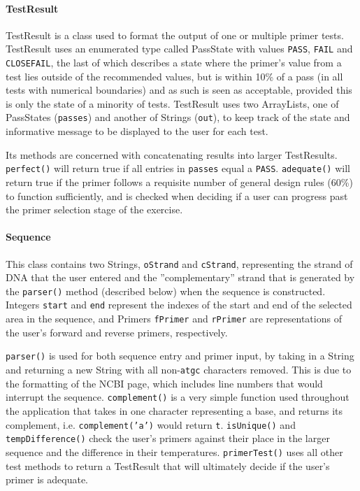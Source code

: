 \paragraph{TestResult}
TestResult is a class used to format the output of one or multiple primer 
tests. TestResult uses an enumerated type called PassState with values
\texttt{PASS}, \texttt{FAIL} and \texttt{CLOSEFAIL}, the last of which describes 
a state where the primer's value from a test lies outside of the recommended
values, but is within 10\% of a pass (in all tests with numerical boundaries) 
and as such is seen as acceptable, provided this is 
only the state of a minority of tests. TestResult uses two ArrayLists, one of
PassStates (\texttt{passes}) and another of Strings (\texttt{out}), to keep track 
of the state and informative message to be displayed to the user for each 
test. 

Its methods are concerned with concatenating results into larger 
TestResults. \texttt{perfect()} will return true if all entries in 
\texttt{passes} equal a \texttt{PASS}. \texttt{adequate()} will return true if the
primer follows a requisite number of general design rules (60\%) to function 
sufficiently, and is checked when deciding if a user can progress past the
primer selection stage of the exercise.
 
\paragraph{Sequence}
This class contains two Strings, \texttt{oStrand} and \texttt{cStrand}, 
representing the strand of DNA that the user entered and the ''complementary''
strand that is generated by the \texttt{parser()} method (described below)
when the sequence is constructed. Integers \texttt{start} and \texttt{end} represent 
the indexes of the start and end of the selected area in the sequence, and Primers 
\texttt{fPrimer} and \texttt{rPrimer} are representations of the user's forward
and reverse primers, respectively.
 
\texttt{parser()} is used for both sequence entry and primer input, by taking in
a String and returning a new String with all non-\texttt{atgc} characters removed.
This is due to the formatting of the NCBI page, which includes line numbers that
would interrupt the sequence.
\texttt{complement()} is a very simple function used throughout the application
that takes in one character representing a base, and returns its complement, i.e.
\texttt{complement('a')} would return \texttt{t}. \texttt{isUnique()} and \texttt{
tempDifference()} check the user's primers against their place in the larger sequence
and the difference in their temperatures. \texttt{primerTest()} uses all other test 
methods to return a TestResult that will ultimately decide if the user's primer is
adequate.  																										%
